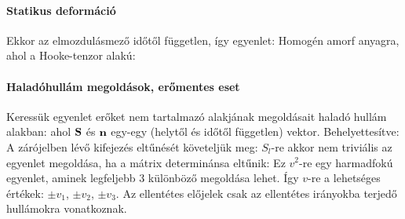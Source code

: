    \paragraph{Statikus deformáció}
    
    Ekkor az elmozdulásmező időtől független, így  egyenlet:
    Homogén amorf anyagra, ahol a Hooke-tenzor  alakú:
    
   \paragraph{Haladóhullám megoldások, erőmentes eset}
    
    Keressük  egyenlet erőket nem tartalmazó alakjának megoldásait haladó hullám alakban:
    ahol $\mathbf{S}$ és $\mathbf{n}$ egy-egy (helytől és időtől független) vektor. Behelyettesítve:
    A zárójelben lévő kifejezés eltűnését követeljük meg:
    $S_l$-re akkor nem triviális az egyenlet megoldása, ha a mátrix determinánsa eltűnik:
    Ez $v^2$-re egy harmadfokú egyenlet, aminek legfeljebb 3 különböző megoldása lehet. Így $v$-re a lehetséges értékek: $\pm v_1$, $\pm v_2$, $\pm v_3$. Az ellentétes előjelek csak az ellentétes irányokba terjedő hullámokra vonatkoznak. 
    
